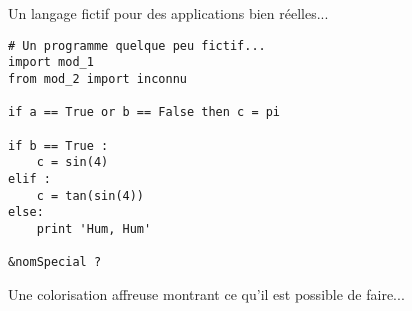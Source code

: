 \documentclass{article}
\begin{document}
Un langage fictif pour des applications bien réelles...

\begin{lstlisting}[caption=Sympa ce package listings]
# Un programme quelque peu fictif...
import mod_1
from mod_2 import inconnu

if a == True or b == False then c = pi

if b == True :
    c = sin(4)
elif :
    c = tan(sin(4))
else:
    print 'Hum, Hum'

&nomSpecial ?
\end{lstlisting}

Une colorisation affreuse montrant ce qu'il est possible de faire...
\end{document}

